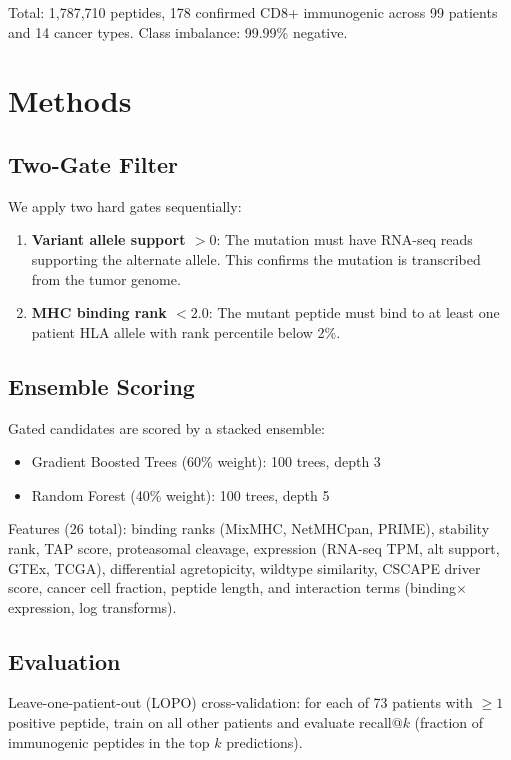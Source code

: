 \documentclass[11pt,twocolumn]{article}
\begin{document}
Total: 1,787,710 peptides, 178 confirmed CD8+ immunogenic across 99 patients
and 14 cancer types. Class imbalance: 99.99\% negative.

\section{Methods}

\subsection{Two-Gate Filter}

We apply two hard gates sequentially:

\begin{enumerate}[nosep]
\item \textbf{Variant allele support $> 0$}: The mutation must have RNA-seq
reads supporting the alternate allele. This confirms the mutation is
transcribed from the tumor genome.
\item \textbf{MHC binding rank $< 2.0$}: The mutant peptide must bind
to at least one patient HLA allele with rank percentile below 2\%.
\end{enumerate}

\subsection{Ensemble Scoring}

Gated candidates are scored by a stacked ensemble:
\begin{itemize}[nosep]
\item Gradient Boosted Trees (60\% weight): 100 trees, depth 3
\item Random Forest (40\% weight): 100 trees, depth 5
\end{itemize}

Features (26 total): binding ranks (MixMHC, NetMHCpan, PRIME), stability
rank, TAP score, proteasomal cleavage, expression (RNA-seq TPM, alt support,
GTEx, TCGA), differential agretopicity, wildtype similarity, CSCAPE driver
score, cancer cell fraction, peptide length, and interaction terms
(binding$\times$expression, log transforms).

\subsection{Evaluation}

Leave-one-patient-out (LOPO) cross-validation: for each of 73 patients
with $\geq 1$ positive peptide, train on all other patients and evaluate
recall@$k$ (fraction of immunogenic peptides in the top $k$ predictions).
\end{document}
